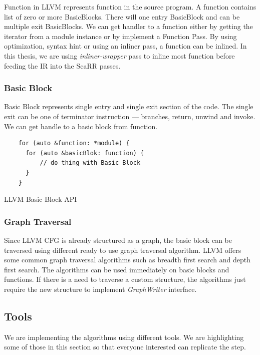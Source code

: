 Function in LLVM represents function in the source program. A function contains list of zero or more BasicBlocks. There will one entry BasicBlock and can be multiple exit BasicBlocks. We can get handler to a function either by getting the iterator from a module instance or by implement a Function Pass. By using optimization, syntax hint or using an inliner pass, a function can be inlined. In this thesis, we are using \emph{inliner-wrapper} pass to inline most function before feeding the IR into the ScaRR passes.

\subsubsection{Basic Block}

Basic Block represents single entry and single exit section of the code. The single exit can be one of terminator instruction — branches, return, unwind and invoke. We can get handle to a basic block from function. 

\begin{listing}
\begin{verbatim}
    for (auto &function: *module) {
      for (auto &basicBlok: function) {
          // do thing with Basic Block
      }
    }
\end{verbatim}
\caption{LLVM Basic Block API}    
\label{listing:2-6}
\end{listing}

\subsubsection{Graph Traversal}

Since LLVM CFG is already structured as a graph, the basic block can be traversed using different ready to use graph traversal algorithm. LLVM offers some common graph traversal algorithms such as breadth first search and depth first search. The algorithms can be used immediately on basic blocks and functions. If there is a need to traverse a custom structure, the algorithms just require the new structure to implement \emph{GraphWriter} interface.

\subsection{Tools}

We are implementing the algorithms using different tools. We are highlighting some of those in this section so that everyone interested can replicate the step.

